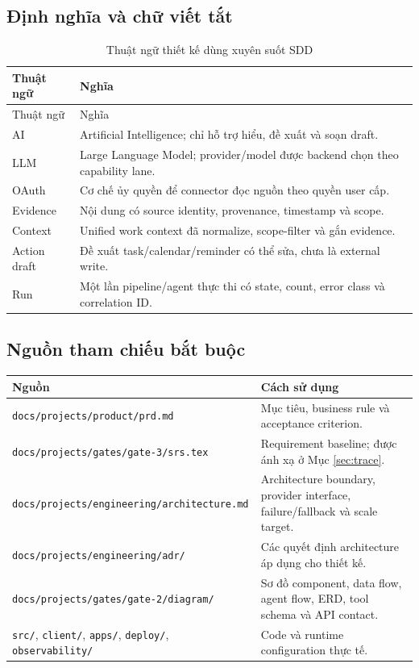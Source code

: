 \documentclass[12pt,a4paper]{article}
\begin{document}
\subsection{Định nghĩa và chữ viết tắt}
\begin{longtable}{p{3.0cm}p{11.5cm}}
\caption{Thuật ngữ thiết kế dùng xuyên suốt SDD}\label{tab:sdd-terms}\\
\toprule Thuật ngữ & Nghĩa \\ \midrule
\endfirsthead
\toprule Thuật ngữ & Nghĩa \\ \midrule
\endhead
AI & Artificial Intelligence; chỉ hỗ trợ hiểu, đề xuất và soạn draft. \\
LLM & Large Language Model; provider/model được backend chọn theo capability lane. \\
OAuth & Cơ chế ủy quyền để connector đọc nguồn theo quyền user cấp. \\
Evidence & Nội dung có source identity, provenance, timestamp và scope. \\
Context & Unified work context đã normalize, scope-filter và gắn evidence. \\
Action draft & Đề xuất task/calendar/reminder có thể sửa, chưa là external write. \\
Run & Một lần pipeline/agent thực thi có state, count, error class và correlation ID. \\
\bottomrule
\end{longtable}

\subsection{Nguồn tham chiếu bắt buộc}
\begin{longtable}{p{4.6cm}p{9.6cm}}
\toprule Nguồn & Cách sử dụng \\ \midrule
\endhead
\texttt{docs/projects/product/prd.md} & Mục tiêu, business rule và acceptance criterion. \\
\texttt{docs/projects/gates/gate-3/srs.tex} & Requirement baseline; được ánh xạ ở Mục \ref{sec:trace}. \\
\texttt{docs/projects/engineering/architecture.md} & Architecture boundary, provider interface, failure/fallback và scale target. \\
\texttt{docs/projects/engineering/adr/} & Các quyết định architecture áp dụng cho thiết kế. \\
\texttt{docs/projects/gates/gate-2/diagram/} & Sơ đồ component, data flow, agent flow, ERD, tool schema và API contact. \\
\texttt{src/}, \texttt{client/}, \texttt{apps/}, \texttt{deploy/}, \texttt{observability/} & Code và runtime configuration thực tế. \\
\bottomrule
\end{longtable}
\end{document}
